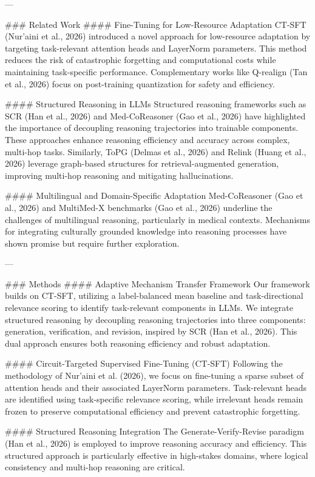 ---

### Related Work
#### Fine-Tuning for Low-Resource Adaptation
CT-SFT (Nur’aini et al., 2026) introduced a novel approach for low-resource adaptation by targeting task-relevant attention heads and LayerNorm parameters. This method reduces the risk of catastrophic forgetting and computational costs while maintaining task-specific performance. Complementary works like Q-realign (Tan et al., 2026) focus on post-training quantization for safety and efficiency.

#### Structured Reasoning in LLMs
Structured reasoning frameworks such as SCR (Han et al., 2026) and Med-CoReasoner (Gao et al., 2026) have highlighted the importance of decoupling reasoning trajectories into trainable components. These approaches enhance reasoning efficiency and accuracy across complex, multi-hop tasks. Similarly, ToPG (Delmas et al., 2026) and Relink (Huang et al., 2026) leverage graph-based structures for retrieval-augmented generation, improving multi-hop reasoning and mitigating hallucinations.

#### Multilingual and Domain-Specific Adaptation
Med-CoReasoner (Gao et al., 2026) and MultiMed-X benchmarks (Gao et al., 2026) underline the challenges of multilingual reasoning, particularly in medical contexts. Mechanisms for integrating culturally grounded knowledge into reasoning processes have shown promise but require further exploration.

---

### Methods
#### Adaptive Mechanism Transfer Framework
Our framework builds on CT-SFT, utilizing a label-balanced mean baseline and task-directional relevance scoring to identify task-relevant components in LLMs. We integrate structured reasoning by decoupling reasoning trajectories into three components: generation, verification, and revision, inspired by SCR (Han et al., 2026). This dual approach ensures both reasoning efficiency and robust adaptation.

#### Circuit-Targeted Supervised Fine-Tuning (CT-SFT)
Following the methodology of Nur’aini et al. (2026), we focus on fine-tuning a sparse subset of attention heads and their associated LayerNorm parameters. Task-relevant heads are identified using task-specific relevance scoring, while irrelevant heads remain frozen to preserve computational efficiency and prevent catastrophic forgetting.

#### Structured Reasoning Integration
The Generate-Verify-Revise paradigm (Han et al., 2026) is employed to improve reasoning accuracy and efficiency. This structured approach is particularly effective in high-stakes domains, where logical consistency and multi-hop reasoning are critical.


